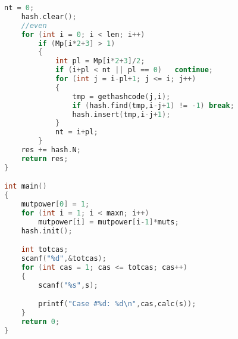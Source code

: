 \begin{lstlisting}[language=c++]
	nt = 0;
	hash.clear();
	//even
	for (int i = 0; i < len; i++)
		if (Mp[i*2+3] > 1)
		{
			int pl = Mp[i*2+3]/2;
			if (i+pl < nt || pl == 0)	continue;
			for (int j = i-pl+1; j <= i; j++)
			{
				tmp = gethashcode(j,i);
				if (hash.find(tmp,i-j+1) != -1)	break;
				hash.insert(tmp,i-j+1);
			}
			nt = i+pl;
		}
	res += hash.N;
	return res;
}

int main()
{
	mutpower[0] = 1;
	for (int i = 1; i < maxn; i++)
		mutpower[i] = mutpower[i-1]*muts;
	hash.init();

	int totcas;
	scanf("%d",&totcas);
	for (int cas = 1; cas <= totcas; cas++)
	{
		scanf("%s",s);

		printf("Case #%d: %d\n",cas,calc(s));
	}
	return 0;
}
	\end{lstlisting}
